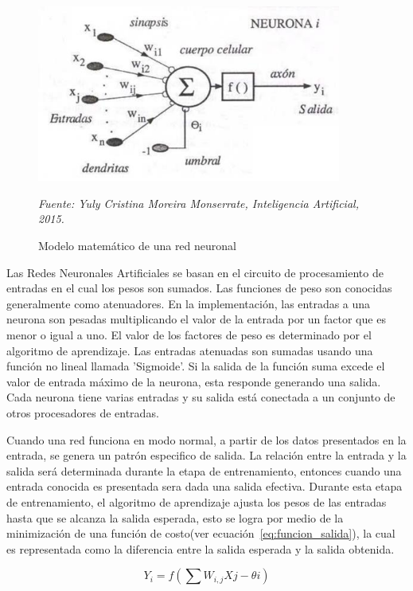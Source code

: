 \begin{figure}[H]
		\centering
		\includegraphics[width=100mm]{Imagenes/neurona_artificial.png}
		\caption{Modelo matemático de una red neuronal}
		\vspace{0.15cm}
		\textit{Fuente: Yuly Cristina Moreira Monserrate, Inteligencia Artificial, 2015.}
		\label{fig:neurona_artificial}
\end{figure}

Las Redes Neuronales Artificiales se basan en el circuito de procesamiento de entradas en el cual los pesos son sumados. Las funciones de peso son conocidas generalmente como atenuadores. En la implementación, las entradas a una neurona son pesadas multiplicando el valor de la entrada por un factor que es menor o igual a uno. El valor de los factores de peso es determinado por el algoritmo de aprendizaje. Las entradas atenuadas son sumadas usando una función no lineal llamada 'Sigmoide'. Si la salida de la función suma excede el valor de entrada máximo de la neurona, esta responde generando una salida. Cada neurona tiene varias entradas y su salida está conectada a un conjunto de otros procesadores de entradas.

Cuando una red funciona en modo normal, a partir de los datos presentados en la entrada, se genera un patrón especifico de salida. La relación entre la entrada y la salida será determinada durante la etapa de  entrenamiento, entonces cuando una entrada conocida es presentada sera dada una salida efectiva. Durante esta etapa de entrenamiento, el algoritmo de aprendizaje ajusta los pesos de las entradas hasta que se alcanza la salida esperada, esto se logra por medio de la minimización de una función de costo(ver ecuación~\ref{eq:funcion_salida}), la cual es representada como la diferencia entre la salida esperada y la salida obtenida.

\begin{equation}\label{eq:funcion_salida}
Y_{i} = f(\sum W_{i,j}X{j} - \theta{i})
\end{equation}

